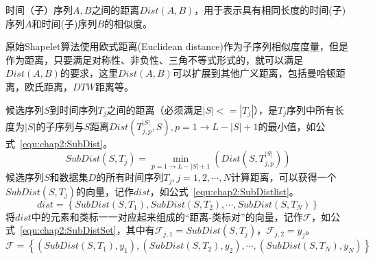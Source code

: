 \begin{definition}
	\label{def:chap2:Dist}
	时间（子）序列$A,B$之间的距离$Dist(A,B)$，用于表示具有相同长度的时间(子)序列$A$和时间(子)序列$B$的相似度。
	
	原始Shapelet算法使用欧式距离(Euclidean distance)作为子序列相似度度量，但是作为距离，只要满足对称性、非负性、三角不等式形式的，就可以满足$Dist(A,B)$的要求，这里$Dist(A,B)$可以扩展到其他广义距离，包括曼哈顿距离，欧氏距离，$DTW$距离等。
\end{definition}

\begin{definition}
\label{def:chap2:SubDist}
	候选序列$S$到时间序列$T_j$之间的距离（必须满足$|S|<=|T_j|$），是$T_j$序列中所有长度为$|S|$的子序列与$S$距离$Dist(T_{j,p}^{|S|},S),p=1\to L-|S|+1$的最小值，如公式~\ref{equ:chap2:SubDist}。
	\begin{equation}\label{equ:chap2:SubDist}
		SubDist(S,T_j) = \min\limits_{p=1\to L-|S|+1} (Dist(S,T_{j,p}^{|S|}))
	\end{equation}
	候选序列$S$和数据集$D$的所有时间序列$T_j,j=1,2,\cdots,N$计算距离，可以获得一个$SubDist(S,T_j)$的向量，记作$dist$，如公式~\ref{equ:chap2:SubDistlist}。
	\begin{equation}
	\label{equ:chap2:SubDistlist}
	dist=\left\lbrace SubDist(S,T_1),SubDist(S,T_2),\cdots,SubDist(S,T_N)\right\rbrace
	\end{equation}
	将$dist$中的元素和类标一一对应起来组成的“距离-类标对”的向量，记作$\mathcal{F}$，如公式~\ref{equ:chap2:SubDistSet}，其中有$\mathcal{F}_{j,1}=SubDist(S,T_j)$，$\mathcal{F}_{j,2}=y_j$。
	\begin{equation}
	\label{equ:chap2:SubDistSet}
	\mathcal{F} = \left\lbrace (SubDist(S,T_1),y_1),(SubDist(S,T_2),y_2),\cdots,(SubDist(S,T_N),y_N) \right\rbrace 
	\end{equation}
\end{definition}

